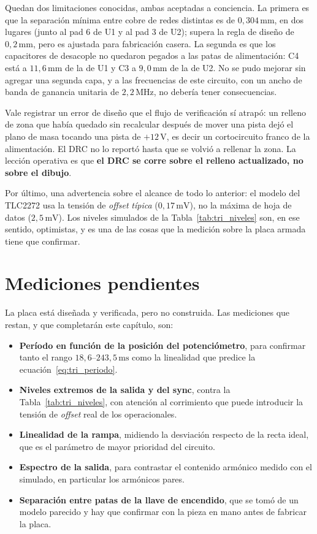 \documentclass[12pt, a4paper, twoside]{report}
\begin{document}
Quedan dos limitaciones conocidas, ambas aceptadas a conciencia. La
primera es que la separación mínima entre cobre de redes distintas es de
$0{,}304\,\text{mm}$, en dos lugares (junto al pad 6 de U1 y al pad 3 de
U2); supera la regla de diseño de $0{,}2\,\text{mm}$, pero es ajustada para
fabricación casera. La segunda es que los capacitores de desacople no
quedaron pegados a las patas de alimentación: C4 está a $11{,}6\,\text{mm}$
de la de U1 y C3 a $9{,}0\,\text{mm}$ de la de U2. No se pudo mejorar sin
agregar una segunda capa, y a las frecuencias de este circuito, con un
ancho de banda de ganancia unitaria de $2{,}2\,\text{MHz}$, no debería
tener consecuencias.

Vale registrar un error de diseño que el flujo de verificación sí atrapó: un
relleno de zona que había quedado sin recalcular después de mover una pista
dejó el plano de masa tocando una pista de $+12\,\text{V}$, es decir un
cortocircuito franco de la alimentación. El DRC no lo reportó hasta que se
volvió a rellenar la zona. La lección operativa es que \textbf{el DRC se
corre sobre el relleno actualizado, no sobre el dibujo}.

Por último, una advertencia sobre el alcance de todo lo anterior: el modelo
del TLC2272 usa la tensión de \textit{offset} \emph{típica}
($0{,}17\,\text{mV}$), no la máxima de hoja de datos
($2{,}5\,\text{mV}$). Los niveles simulados de la
Tabla~\ref{tab:tri_niveles} son, en ese sentido, optimistas, y es una de
las cosas que la medición sobre la placa armada tiene que confirmar.

\section{Mediciones pendientes}
\label{sec:tri_pendiente}

La placa está diseñada y verificada, pero no construida. Las mediciones
que restan, y que completarán este capítulo, son:

\begin{itemize}
  \item \textbf{Período en función de la posición del potenciómetro}, para
    confirmar tanto el rango $18{,}6$--$243{,}5\,\text{ms}$ como la
    linealidad que predice la ecuación~\eqref{eq:tri_periodo}.
  \item \textbf{Niveles extremos de la salida y del sync}, contra la
    Tabla~\ref{tab:tri_niveles}, con atención al corrimiento que puede
    introducir la tensión de \textit{offset} real de los operacionales.
  \item \textbf{Linealidad de la rampa}, midiendo la desviación respecto de
    la recta ideal, que es el parámetro de mayor prioridad del circuito.
  \item \textbf{Espectro de la salida}, para contrastar el contenido
    armónico medido con el simulado, en particular los armónicos pares.
  \item \textbf{Separación entre patas de la llave de encendido}, que se
    tomó de un modelo parecido y hay que confirmar con la pieza en mano
    antes de fabricar la placa.
\end{itemize}
\end{document}
